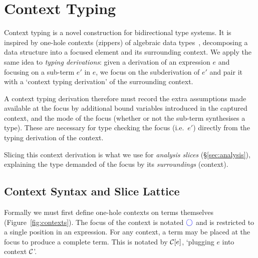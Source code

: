 \vspace{-12pt}
\section{Context Typing}
\label{sec:context-typing}

Context typing is a novel construction for bidirectional type systems. It is inspired by one-hole contexts (zippers) of algebraic data types~\cite{Huet1997}, decomposing a data structure into a focused element and its surrounding context. We apply the same idea to \textit{typing derivations}: given a derivation of an expression $e$ and focusing on a sub-term $e'$ in $e$, we focus on the subderivation of $e'$ and pair it with a `context typing derivation' of the surrounding context.

A context typing derivation therefore must record the extra assumptions made available at the focus by additional bound variables introduced in the captured context, and the mode of the focus (whether or not the sub-term synthesises a type). These are necessary for type checking the focus (i.e.\ $e'$) directly from the typing derivation of the context. 

Slicing this context derivation is what we use for \textit{analysis slices} (\S\ref{sec:analysis}), explaining the type demanded of the focus by its \textit{surroundings} (context).

\subsection{Context Syntax and Slice Lattice}
\label{sec:context-syntax}


Formally we must first define one-hole contexts on terms themselves (Figure~\ref{fig:contexts}). The focus of the context is notated ${\color{blue}\bigcirc}$ and is restricted to a single position in an expression. For any context, a term may be placed at the focus to produce a complete term. This is notated by $\mathcal{C}[e]$, `plugging $e$ into context $\mathcal{C}$'.

